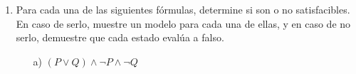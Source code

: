 \documentclass[letterpaper,11pt]{article}
\begin{document}
\begin{enumerate}
\begin{itemize}
        \item[b)] $(A \land B) → Q ≡ (A → Q) \lor (B → Q)$ 
        \begin{proof}
            \begin{align*}
                (A \land B) → Q 
                ≡& \; \neg (A \land B) \lor Q
                && \text{equivalencia de $→$} \\ 
                ≡& \; (\neg A \lor \neg B) \lor Q
                && \text{De Morgan} \\
                ≡& \; (\neg A \lor \neg B) \lor (Q \lor Q)
                && \text{idempotencia} \\ 
                ≡& \; (\neg A \lor Q) \lor (\neg B \lor Q)
                && \text{distributividad} \\
                ≡& \; (A → Q) \lor (B → Q)
                && \text{equivalencia de $→$}
            \end{align*}
        \end{proof}

        \item[c)] $(A \land B) → Q ≡ A → (B → Q)$
        \begin{proof}
            \begin{align*}
                (A \land B) → Q 
                ≡& \; \neg (A \land B) \lor Q
                && \text{equivalencia de $→$} \\ 
                ≡& \; (\neg A \lor \neg B) \lor Q
                && \text{De Morgan} \\ 
                ≡& \; \neg A \lor (\neg B \lor Q)
                && \text{asociatividad} \\ 
                ≡& \; A → (B → Q)
                && \text{equivalencia de $→$}
            \end{align*}
        \end{proof}
    \end{itemize}

    \item Para cada una de las siguientes fórmulas, determine si son o no 
    satisfacibles. En caso de serlo, muestre un modelo para cada una de ellas,
    y en caso de no serlo, demuestre que cada estado evalúa a falso.

    \begin{itemize}
        \item[a)] $(P \lor Q) \land \neg P \land \neg Q$ 


\end{itemize}
\end{enumerate}
\end{document}
